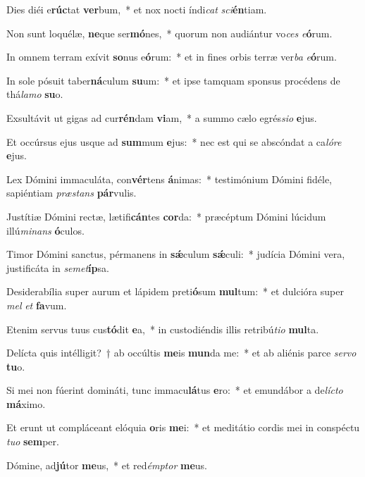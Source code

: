 \item Dies diéi e\textbf{rúc}tat \textbf{ver}bum,~* et nox nocti índi\textit{cat} \textit{sci}\textbf{én}tiam.
\item Non sunt loquélæ, \textbf{ne}que ser\textbf{mó}nes,~* quorum non audiántur vo\textit{ces} \textit{e}\textbf{ó}rum.
\item In omnem terram exívit \textbf{so}nus e\textbf{ó}rum:~* et in fines orbis terræ ver\textit{ba} \textit{e}\textbf{ó}rum.
\item In sole pósuit taber\textbf{ná}culum \textbf{su}um:~* et ipse tamquam sponsus procédens de thá\textit{la}\textit{mo} \textbf{su}o.
\item Exsultávit ut gigas ad cur\textbf{rén}dam \textbf{vi}am,~* a summo cælo egrés\textit{si}\textit{o} \textbf{e}jus.
\item Et occúrsus ejus usque ad \textbf{sum}mum \textbf{e}jus:~* nec est qui se abscóndat a ca\textit{ló}\textit{re} \textbf{e}jus.
\item Lex Dómini immaculáta, con\textbf{vér}tens \textbf{á}nimas:~* testimónium Dómini fidéle, sapiéntiam \textit{præ}\textit{stans} \textbf{pár}vulis.
\item Justítiæ Dómini rectæ, lætifi\textbf{cán}tes \textbf{cor}da:~* præcéptum Dómini lúcidum illú\textit{mi}\textit{nans} \textbf{ó}culos.
\item Timor Dómini sanctus, pérmanens in \textbf{sǽ}culum \textbf{sǽ}culi:~* judícia Dómini vera, justificáta in \textit{se}\textit{met}\textbf{íp}sa.
\item Desiderabília super aurum et lápidem preti\textbf{ó}sum \textbf{mul}tum:~* et dulcióra super \textit{mel} \textit{et} \textbf{fa}vum.
\item Etenim servus tuus cus\textbf{tó}dit \textbf{e}a,~* in custodiéndis illis retribú\textit{ti}\textit{o} \textbf{mul}ta.
\item Delícta quis intélligit?~† ab occúltis \textbf{me}is \textbf{mun}da me:~* et ab aliénis parce \textit{ser}\textit{vo} \textbf{tu}o.
\item Si mei non fúerint domináti, tunc immacu\textbf{lá}tus \textbf{e}ro:~* et emundábor a de\textit{líc}\textit{to} \textbf{má}ximo.
\item Et erunt ut compláceant elóquia \textbf{o}ris \textbf{me}i:~* et meditátio cordis mei in conspéctu \textit{tu}\textit{o} \textbf{sem}per.
\item Dómine, ad\textbf{jú}tor \textbf{me}us,~* et red\textit{émp}\textit{tor} \textbf{me}us.
